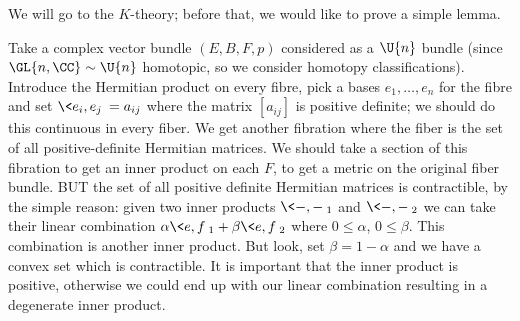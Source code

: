 
We will go to the $K$-theory; before that, we would like to prove
a simple lemma.

\begin{ddanger}
Take a complex vector bundle $(E,B,F,p)$ considered as a $\U{n}$
bundle (since $\GL{n,\CC}\homotopic\U{n}$ homotopic, so we
consider homotopy classifications). Introduce the Hermitian
product on every fibre, pick a bases $e_{1},\dots,e_{n}$ for the
fibre and set $\<e_{i},e_{j}\>=a_{ij}$ where the matrix
$[a_{ij}]$ is positive definite; we should do this continuous in
every fiber. We get another fibration where the fiber is the set
of all positive-definite Hermitian matrices. We should take a
section of this fibration to get an inner product on each $F$,
to get a metric on the original fiber bundle. BUT the set of all
positive definite Hermitian matrices is contractible, by the
simple reason: given two inner products $\<-,-\>_{1}$ and
$\<-,-\>_{2}$ we can take their linear combination
$\alpha\<e,f\>_{1}+\beta\<e,f\>_{2}$ where $0\leq\alpha$,
$0\leq\beta$. This combination is another inner product. But
look, set $\beta=1-\alpha$ and we have a convex set which is
contractible. It is important that the inner product is positive,
otherwise we could end up with our linear combination resulting
in a degenerate inner product.
\end{ddanger}

